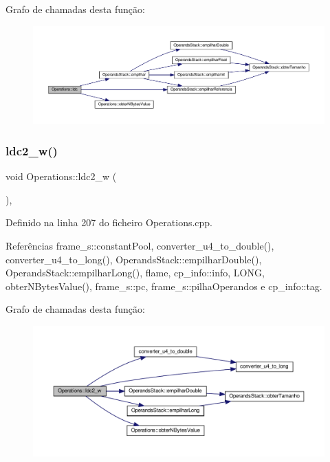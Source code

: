 Grafo de chamadas desta função\+:
\nopagebreak
\begin{figure}[H]
\begin{center}
\leavevmode
\includegraphics[width=350pt]{classOperations_aa9a87c1ef4605d0b7b7a99c8d9bc693c_cgraph}
\end{center}
\end{figure}
\mbox{\label{classOperations_ae5f11d6a8ea22b30f316c47af914f05a}} 
\subsubsection{\texorpdfstring{ldc2\+\_\+w()}{ldc2\_w()}}
{\footnotesize\ttfamily void Operations\+::ldc2\+\_\+w (\begin{DoxyParamCaption}{ }\end{DoxyParamCaption})\hspace{0.3cm}{\ttfamily [static]}, {\ttfamily [private]}}



Definido na linha 207 do ficheiro Operations.\+cpp.



Referências frame\+\_\+s\+::constant\+Pool, converter\+\_\+u4\+\_\+to\+\_\+double(), converter\+\_\+u4\+\_\+to\+\_\+long(), Operands\+Stack\+::empilhar\+Double(), Operands\+Stack\+::empilhar\+Long(), flame, cp\+\_\+info\+::info, L\+O\+NG, obter\+N\+Bytes\+Value(), frame\+\_\+s\+::pc, frame\+\_\+s\+::pilha\+Operandos e cp\+\_\+info\+::tag.

Grafo de chamadas desta função\+:
\nopagebreak
\begin{figure}[H]
\begin{center}
\leavevmode
\includegraphics[width=350pt]{classOperations_ae5f11d6a8ea22b30f316c47af914f05a_cgraph}
\end{center}
\end{figure}
\mbox{\label{classOperations_a081fd22827f77e8ce5219275256cc831}} 
